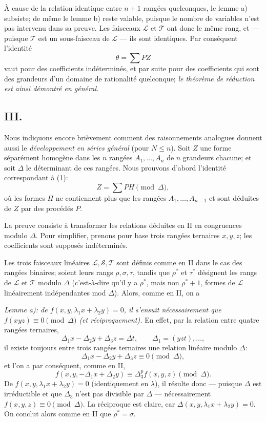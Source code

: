 À cause de la relation identique entre $n+1$ rangées quelconques, le lemme a) subsiste; de même le lemme b) reste valable, puisque le nombre de variables n'est pas intervenu dans sa preuve. Les faisceaux $\mathcal L$ et $\mathcal T$ ont donc le même rang, et --- puisque $\mathcal T$ est un sous-faisceau de $\mathcal L$ --- ils sont identiques. Par conséquent l'identité
\[
  \theta=\sum PZ
\]
vaut pour des coefficients indéterminés, et par suite pour des coefficients qui sont des grandeurs d'un domaine de rationalité quelconque; \emph{le théorème de réduction est ainsi démontré en général.}

\subsection*{III.}
Nous indiquons encore brièvement comment des raisonnements analogues donnent aussi le \emph{développement en séries général} (pour $N\le n$). Soit $Z$ une forme séparément homogène dans les $n$ rangées $A_1,\ldots,A_n$ de $n$ grandeurs chacune; et soit $\Delta$ le déterminant de ces rangées. Nous prouvons d'abord l'identité correspondant à (1):
\begin{equation}
  Z=\sum PH \pmod{\Delta},
\tag{2}
\end{equation}
où les formes $H$ ne contiennent plus que les rangées $A_1,\ldots,A_{n-1}$ et sont déduites de $Z$ par des procédés $P$.

La preuve consiste à transformer les relations déduites en II en congruences modulo $\Delta$. Pour simplifier, prenons pour base trois rangées ternaires $x,y,z$; les coefficients sont supposés indéterminés.

Les trois faisceaux linéaires $\mathcal L,\mathcal S,\mathcal T$ sont définis comme en II dans le cas des rangées binaires; soient leurs rangs $\rho,\sigma,\tau$, tandis que $\rho^*$ et $\tau^*$ désignent les rangs de $\mathcal L$ et $\mathcal T$ modulo $\Delta$ (c'est-à-dire qu'il y a $\rho^*$, mais non $\rho^*+1$, formes de $\mathcal L$ linéairement indépendantes mod $\Delta$). Alors, comme en II, on a

\emph{Lemme a): de $f(x,y,\lambda_1x+\lambda_2y)=0$, il s'ensuit nécessairement que $f(xyz)\equiv0\pmod{\Delta}$ (et réciproquement).} En effet, par la relation entre quatre rangées ternaires,
\[
  \Delta_1x-\Delta_2y+\Delta_3z=\Delta t,
  \qquad \Delta_1=(yzt),\ldots,
\]
il existe toujours entre trois rangées ternaires une relation linéaire modulo $\Delta$:
\[
  \Delta_1x-\Delta_2y+\Delta_3z\equiv0\pmod{\Delta},
\]
et l'on a par conséquent, comme en II,
\[
  f(x,y,-\Delta_1x+\Delta_2y)\equiv\Delta_3^p f(x,y,z)\pmod{\Delta}.
\]
De $f(x,y,\lambda_1x+\lambda_2y)=0$ (identiquement en $\lambda$), il résulte donc --- puisque $\Delta$ est irréductible et que $\Delta_3$ n'est pas divisible par $\Delta$ --- nécessairement $f(x,y,z)\equiv0\pmod{\Delta}$. La réciproque est claire, car $\Delta(x,y,\lambda_1x+\lambda_2y)=0$. On conclut alors comme en II que $\rho^*=\sigma$.

